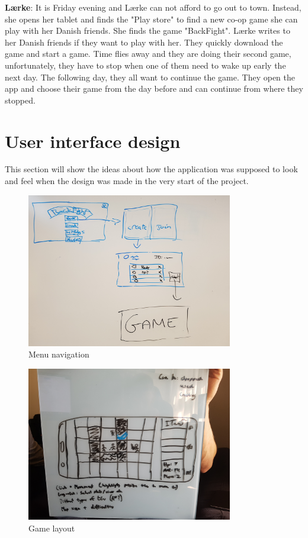 \textbf{Lærke}:
It is Friday evening and Lærke can not afford to go out to town. Instead, she opens her tablet and finds the "Play store" to find a new co-op game she can play with her Danish friends. She finds the game "BackFight". Lærke writes to her Danish friends if they want to play with her. They quickly download the game and start a game. Time flies away and they are doing their second game, unfortunately, they have to stop when one of them need to wake up early the next day. The following day, they all want to continue the game. They open the app and choose their game from the day before and can continue from where they stopped.

\section{User interface design}
This section will show the ideas about how the application was supposed to look and feel when the design was made in the very start of the project.

\begin{figure}[ht!]
	\centering
	\includegraphics[width=90mm]{images/Gui.png}
	\caption{Menu navigation \label{overflow}}
\end{figure}

\begin{figure}[ht!]
	\centering
	\includegraphics[width=90mm]{images/GameView.png}
	\caption{Game layout \label{Test}}
\end{figure}

